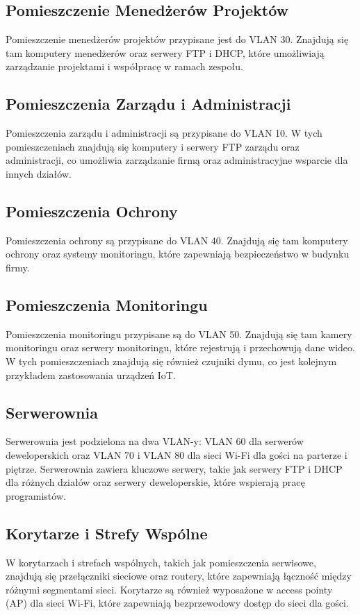 \subsection{Pomieszczenie Menedżerów Projektów}
Pomieszczenie menedżerów projektów przypisane jest do VLAN 30. Znajdują się tam komputery menedżerów oraz serwery FTP i DHCP, które umożliwiają zarządzanie projektami i współpracę w ramach zespołu.

\subsection{Pomieszczenia Zarządu i Administracji}
Pomieszczenia zarządu i administracji są przypisane do VLAN 10. W tych pomieszczeniach znajdują się komputery i serwery FTP zarządu oraz administracji, co umożliwia zarządzanie firmą oraz administracyjne wsparcie dla innych działów.

\subsection{Pomieszczenia Ochrony}
Pomieszczenia ochrony są przypisane do VLAN 40. Znajdują się tam komputery ochrony oraz systemy monitoringu, które zapewniają bezpieczeństwo w budynku firmy.

\subsection{Pomieszczenia Monitoringu}
Pomieszczenia monitoringu przypisane są do VLAN 50. Znajdują się tam kamery monitoringu oraz serwery monitoringu, które rejestrują i przechowują dane wideo. W tych pomieszczeniach znajdują się również czujniki dymu, co jest kolejnym przykładem zastosowania urządzeń IoT.

\subsection{Serwerownia}
Serwerownia jest podzielona na dwa VLAN-y: VLAN 60 dla serwerów deweloperskich oraz VLAN 70 i VLAN 80 dla sieci Wi-Fi dla gości na parterze i piętrze. Serwerownia zawiera kluczowe serwery, takie jak serwery FTP i DHCP dla różnych działów oraz serwery deweloperskie, które wspierają pracę programistów.

\subsection{Korytarze i Strefy Wspólne}
W korytarzach i strefach wspólnych, takich jak pomieszczenia serwisowe, znajdują się przełączniki sieciowe oraz routery, które zapewniają łączność między różnymi segmentami sieci. Korytarze są również wyposażone w access pointy (AP) dla sieci Wi-Fi, które zapewniają bezprzewodowy dostęp do sieci dla gości.

